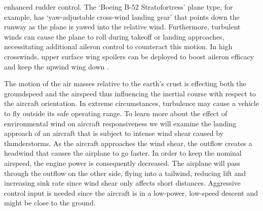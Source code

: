 \documentclass[conference]{IEEEtran}
\begin{document}
enhanced rudder control. The `Boeing B-52 Stratofortress' plane type, for
example, has `yaw-adjustable cross-wind landing gear' that points down the
runway as the plane is yawed into the relative wind. Furthermore, turbulent
winds can cause the plane to roll during takeoff or landing approaches,
necessitating additional aileron control to counteract this motion. In high
crosswinds, upper surface wing spoilers can be deployed to boost aileron
efficacy and keep the upwind wing down {\cite{51}}.
\par
The motion of the air masses relative to the earth's crust is effecting both the groundspeed and the airspeed
thus influencing the inertial course with respect to the aircraft orientation. In
extreme circumstances, turbulence may cause a vehicle to fly outside its safe
operating range. To learn more about the effect of environmental wind on
aircraft responsiveness we will examine the landing approach of an aircraft
that is subject to intense wind shear caused by thunderstorms. As the aircraft
approaches the wind shear, the outflow creates a headwind that causes the
airplane to go faster. In order to keep the nominal airspeed, the engine power
is consequently decreased. The airplane will pass through the outflow on the
other side, flying into a tailwind, reducing lift and increasing sink rate
since wind shear only affects short distances. Aggressive control input is
needed since the aircraft is in a low-power, low-speed descent and might be
close to the ground.

\end{document}
